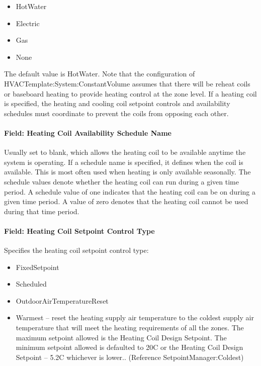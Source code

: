 \begin{itemize}
\item
  HotWater
\item
  Electric
\item
  Gas
\item
  None
\end{itemize}

The default value is HotWater. Note that the configuration of HVACTemplate:System:ConstantVolume assumes that there will be reheat coils or baseboard heating to provide heating control at the zone level. If a heating coil is specified, the heating and cooling coil setpoint controls and availability schedules must coordinate to prevent the coils from opposing each other.

\paragraph{Field: Heating Coil Availability Schedule Name}\label{field-heating-coil-availability-schedule-name-7}

Usually set to blank, which allows the heating coil to be available anytime the system is operating. If a schedule name is specified, it defines when the coil is available. This is most often used when heating is only available seasonally. The schedule values denote whether the heating coil can run during a given time period. A schedule value of one indicates that the heating coil can be on during a given time period. A value of zero denotes that the heating coil cannot be used during that time period.

\paragraph{Field: Heating Coil Setpoint Control Type}\label{field-heating-coil-setpoint-control-type-1}

Specifies the heating coil setpoint control type:

\begin{itemize}
\item
  FixedSetpoint
\item
  Scheduled
\item
  OutdoorAirTemperatureReset
\item
  Warmest -- reset the heating supply air temperature to the coldest supply air temperature that will meet the heating requirements of all the zones. The maximum setpoint allowed is the Heating Coil Design Setpoint. The minimum setpoint allowed is defaulted to 20C or the Heating Coil Design Setpoint -- 5.2C whichever is lower.. (Reference SetpointManager:Coldest)
\end{itemize}

